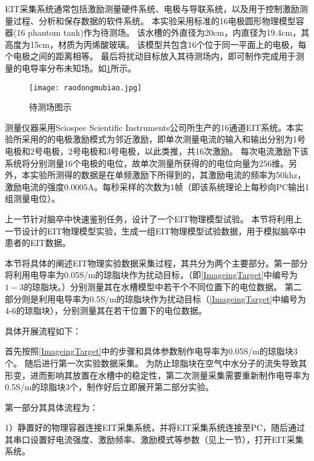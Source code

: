EIT采集系统通常包括激励测量硬件系统、电极与导联系统，以及用于控制激励测量过程、分析和保存数据的软件系统。
本实验采用标准的16电极圆形物理模型容器(16 phantom tank)作为待测场。
该水槽的外直径为20cm，内直径为19.4cm，其高度为15cm，材质为丙烯酸玻璃。
该模型共包含16个位于同一平面上的电极，每个电极之间的距离相等。
最后将扰动目标放入其待测场内，即可制作完成用于测量的电导率分布未知场。如\cref{figure:raodongmubiao}所示。
\begin{figure}[H]
    \centering
    \texttt{[image: raodongmubiao.jpg]}
    \caption{待测场图示}
    \label{figure:raodongmubiao}
\end{figure}
测量仪器采用Sciospec Scientific Instruments公司所生产的16通道EIT系统。本实验所采用的的电极激励模式为邻近激励，即单次测量电流的输入和输出分别为1号电极和2号电极，2号电极和3号电极，以此类推，共16次激励。
每次电流激励下该系统将分别测量16个电极的电位，故单次测量所获得的的电位向量为256维。另外，本实验所测得的数据是在单频激励下所得到的，其激励电流的频率为50khz，
激励电流的强度0.0005A。每秒采样的次数为1帧（即该系统理论上每秒向PC输出1组测量电位）。




上一节针对脑卒中快速鉴别任务，设计了一个EIT物理模型试验。
本节将利用上一节设计的EIT物理模型实验，生成一组EIT物理模型试验数据，用于模拟脑卒中患者的EIT数据。



本节将具体的阐述EIT物理实验数据采集过程，其共分为两个主要部分。第一部分将利用电导率为0.05S/m的琼脂块作为扰动目标，（即\cref{ImageingTarget}中编号为$1-3$的琼脂块。）分别测量其在水槽模型中若干个不同位置下的电位数据。
第二部分则是利用电导率为0.5S/m的琼脂块作为扰动目标（\cref{ImageingTarget}中编号为4-6的琼脂块），分别测量其在若干位置下的电位数据。

具体开展流程如下：

首先按照\cref{ImageingTarget}中的步骤和具体参数制作电导率为0.05S/m的琼脂块3个。
随后进行第一次实验数据采集。
为防止琼脂块在空气中水分子的流失导致其形变，进而影响其放置在水槽中的稳定性，第二次测量采集需要重新制作电导率为0.5S/m的琼脂块3个，制作好后立即展开第二部分实验。

第一部分其具体流程为：

     1）静置好的物理容器连接EIT采集系统，并将EIT采集系统连接至PC，随后通过其串口设置好电流强度、激励频率、激励模式等参数（见上一节），打开EIT采集系统。

